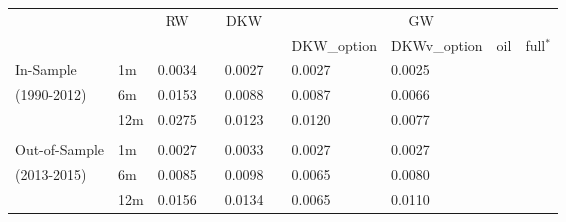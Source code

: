 \documentclass{article}
\begin{document}
\begin{tabular}{llcccccccc}
\hline\hline
&  & RW &  & DKW &  & \multicolumn{4}{c}{GW} \\ \cline{7-10}
&  &  &  &  &  & DKW\_option & DKWv\_option & oil & full$^{\ast }$ \\ \hline
In-Sample & 1m & \multicolumn{1}{l}{0.0034} & \multicolumn{1}{l}{} & 
\multicolumn{1}{l}{0.0027} & \multicolumn{1}{l}{} & \multicolumn{1}{l}{0.0027
} & \multicolumn{1}{l}{0.0025} &  & \multicolumn{1}{l}{} \\ 
(1990-2012) & 6m & \multicolumn{1}{l}{0.0153} & \multicolumn{1}{l}{} & 
\multicolumn{1}{l}{0.0088} & \multicolumn{1}{l}{} & \multicolumn{1}{l}{0.0087
} & \multicolumn{1}{l}{0.0066} &  & \multicolumn{1}{l}{} \\ 
& 12m & \multicolumn{1}{l}{0.0275} & \multicolumn{1}{l}{} & 
\multicolumn{1}{l}{0.0123} & \multicolumn{1}{l}{} & \multicolumn{1}{l}{0.0120
} & \multicolumn{1}{l}{0.0077} &  & \multicolumn{1}{l}{} \\ 
&  & \multicolumn{1}{l}{} & \multicolumn{1}{l}{} & \multicolumn{1}{l}{} & 
\multicolumn{1}{l}{} & \multicolumn{1}{l}{} & \multicolumn{1}{l}{} &  & 
\multicolumn{1}{l}{} \\ \hline
Out-of-Sample & 1m & \multicolumn{1}{l}{0.0027} & \multicolumn{1}{l}{} & 
\multicolumn{1}{l}{0.0033} & \multicolumn{1}{l}{} & \multicolumn{1}{l}{0.0027
} & \multicolumn{1}{l}{0.0027} &  & \multicolumn{1}{l}{} \\ 
(2013-2015) & 6m & 0.0085 &  & 0.0098 &  & \multicolumn{1}{l}{0.0065} & 
\multicolumn{1}{l}{0.0080} &  &  \\ 
& 12m & \multicolumn{1}{l}{0.0156} & \multicolumn{1}{l}{} & 
\multicolumn{1}{l}{0.0134} & \multicolumn{1}{l}{} & \multicolumn{1}{l}{0.0065
} & \multicolumn{1}{l}{0.0110} &  & \multicolumn{1}{l}{} \\ \hline\hline
\end{tabular}
\end{document}
